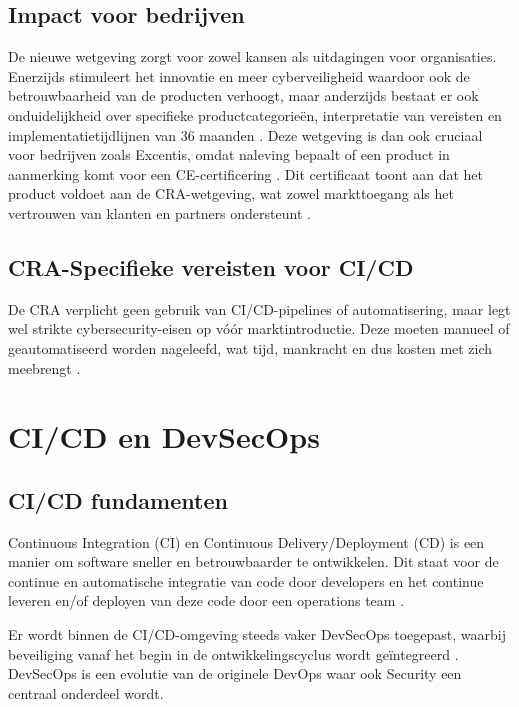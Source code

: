\subsection{Impact voor bedrijven}
De nieuwe wetgeving zorgt voor zowel kansen als uitdagingen voor organisaties. Enerzijds stimuleert het innovatie en meer cyberveiligheid waardoor ook de betrouwbaarheid van de producten verhoogt, maar anderzijds bestaat er ook onduidelijkheid over specifieke productcategorieën, interpretatie van vereisten en implementatietijdlijnen van 36 maanden \autocite{ECSO2024}. Deze wetgeving is dan ook cruciaal voor bedrijven zoals Excentis, omdat naleving bepaalt of een product in aanmerking komt voor een CE-certificering \autocite{EuropeanCommission2024CRAnews}. Dit certificaat toont aan dat het product voldoet aan de CRA-wetgeving, wat zowel markttoegang als het vertrouwen van klanten en partners ondersteunt \autocite{RVO_CE}.

\subsection{CRA-Specifieke vereisten voor CI/CD}

De CRA verplicht geen gebruik van CI/CD-pipelines of automatisering, maar legt wel strikte cybersecurity-eisen op vóór marktintroductie. Deze moeten manueel of geautomatiseerd worden nageleefd, wat tijd, mankracht en dus kosten met zich meebrengt \autocite{Claranet2025}.

\section{CI/CD en DevSecOps}

\subsection{CI/CD fundamenten}
Continuous Integration (CI) en Continuous Delivery/Deployment (CD) is een manier om software sneller en betrouwbaarder te ontwikkelen. Dit staat voor de continue en automatische integratie van code door developers en het continue leveren en/of deployen van deze code door een operations team \autocite{RedHat2025}.

Er wordt binnen de CI/CD-omgeving steeds vaker DevSecOps toegepast, waarbij beveiliging vanaf het begin in de ontwikkelingscyclus wordt geïntegreerd \autocite{RamdassJain2025}. DevSecOps is een evolutie van de originele DevOps waar ook Security een centraal onderdeel wordt.

